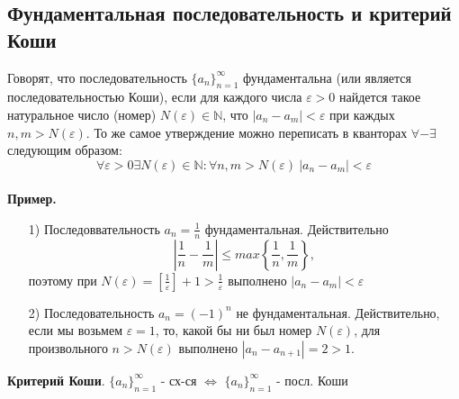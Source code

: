 \documentclass[12pt]{article}
\theoremstyle{definition}
\begin{document}
\subsection{Фундаментальная последовательность и критерий Коши}
Говорят, что последовательность $\{a_n\}^\infty_{n=1}$ фундаментальна (или является последовательностью Коши), если для каждого числа $\varepsilon > 0$ найдется такое натуральное число (номер) $N(\varepsilon) \in \mathds{N}$, что $|a_n - a_m| < \varepsilon$ при каждых $n, m > N(\varepsilon)$. То же самое утверждение можно переписать в кванторах $\forall - \exists$ следующим образом: $$\forall \varepsilon > 0 \exists N(\varepsilon) \in \mathds{N}: \forall n, m > N(\varepsilon) \ |a_n - a_m| < \varepsilon$$ \\ 
\textbf{Пример.} \begin{itemize}
    \item[1)]Последоввательность $a_n =\frac{1}{n}$  фундаментальная. Действительно $$\left|\frac{1}{n} - \frac{1}{m}\right| \leqslant max\left\{\frac{1}{n}, \frac{1}{m}\right\},$$ поэтому при $N(\varepsilon) = \left[\frac{1}{\varepsilon}\right] + 1 > \frac{1}{\varepsilon} \text{ выполнено } |a_n - a_m| < \varepsilon$
    \item[2)] Последовательность $a_n = (-1)^n$ не фундаментальная. Действительно, если мы возьмем  $\varepsilon = 1$, то, какой бы ни был номер $N(\varepsilon)$, для произвольного $n > N(\varepsilon)$ выполнено $|a_n - a_{n+1}| = 2 > 1.$
\end{itemize} 
\textbf{Критерий Коши}. $\{a_n\}_{n=1}^\infty$ - сх-ся $\iff$ $\{a_n\}_{n=1}^\infty$ - посл. Коши
\end{document}
